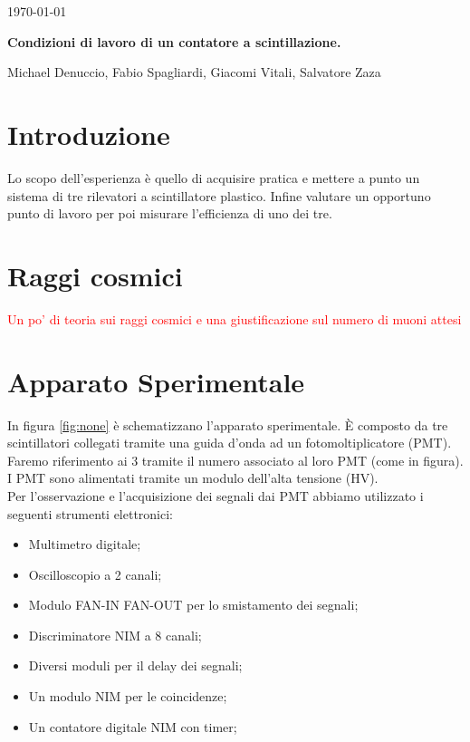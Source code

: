\documentclass[a4paper,10pt]{article}
\newcommand{\note}[1]{\textcolor{red}{#1}}
\begin{document}
\begin{flushright}             
\today
\end{flushright} 

\begin{center}
\Large{\bf Condizioni di lavoro di un contatore a scintillazione. }

\vspace*{1cm}                                 
\large{Michael Denuccio, Fabio Spagliardi, Giacomi Vitali, Salvatore Zaza }\\ 
\vspace*{0.5cm}       
\vspace*{1.cm}
\end{center}



\section{Introduzione}
\label{sec:intro} 
Lo scopo dell'esperienza è quello di acquisire pratica e mettere a punto un sistema di tre rilevatori a scintillatore plastico. Infine valutare un opportuno punto di lavoro per poi misurare l'efficienza di uno dei tre.

\section{Raggi cosmici}
\note{Un po' di teoria sui raggi cosmici e una giustificazione sul numero di muoni attesi}

\section{Apparato Sperimentale}
In figura \ref{fig:none} è schematizzano l'apparato sperimentale. \`E composto da tre scintillatori collegati tramite una guida d'onda ad un fotomoltiplicatore (PMT). Faremo riferimento ai 3 tramite il numero associato al loro PMT (come in figura).
\\I PMT sono alimentati tramite un modulo dell'alta tensione (HV). 
\\Per l'osservazione e l'acquisizione dei segnali dai PMT abbiamo utilizzato i seguenti strumenti elettronici:
\begin{itemize}
\item Multimetro digitale;
\item Oscilloscopio a 2 canali;
\item Modulo FAN-IN FAN-OUT per lo smistamento dei segnali;
\item Discriminatore NIM a 8 canali;
\item Diversi moduli per il delay dei segnali;
\item Un modulo NIM per le coincidenze;
\item Un contatore digitale NIM con timer;
\end{itemize}
\end{document}
